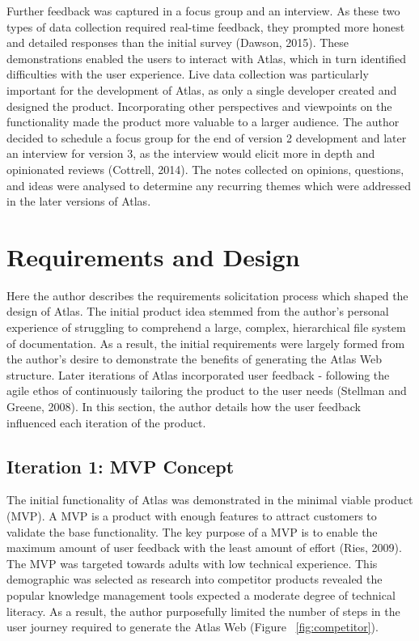\documentclass{article}
\begin{document}
Further feedback was captured in a focus group and an interview. As these two types of data collection required real-time feedback, they prompted more honest and detailed responses than the initial survey (Dawson, 2015). These demonstrations enabled the users to interact with Atlas, which in turn identified difficulties with the user experience. Live data collection was particularly important for the development of Atlas, as only a single developer created and designed the product. Incorporating other perspectives and viewpoints on the functionality made the product more valuable to a larger audience. The author decided to schedule a focus group for the end of version 2 development and later an interview for version 3, as the interview would elicit more in depth and opinionated reviews (Cottrell, 2014). The notes collected on opinions, questions, and ideas were analysed to determine any recurring themes which were addressed in the later versions of Atlas.

\newpage
\section{Requirements and Design}

Here the author describes the requirements solicitation process which shaped the design of Atlas. The initial product idea stemmed from the author's personal experience of struggling to comprehend a large, complex, hierarchical file system of documentation. As a result, the initial requirements were largely formed from the author's desire to demonstrate the benefits of generating the Atlas Web structure. Later iterations of Atlas incorporated user feedback - following the agile ethos of continuously tailoring the product to the user needs (Stellman and Greene, 2008). In this section, the author details how the user feedback influenced each iteration of the product.

\subsection{Iteration 1: MVP Concept}

The initial functionality of Atlas was demonstrated in the minimal viable product (MVP). A MVP is a product with enough features to attract customers to validate the base functionality. The key purpose of a MVP is to enable the maximum amount of user feedback with the least amount of effort (Ries, 2009). The MVP was targeted towards adults with low technical experience. This demographic was selected as research into competitor products revealed the popular knowledge management tools expected a moderate degree of technical literacy. As a result, the author purposefully limited the number of steps in the user journey required to generate the Atlas Web (Figure ~\ref{fig:competitor}). 
\end{document}
